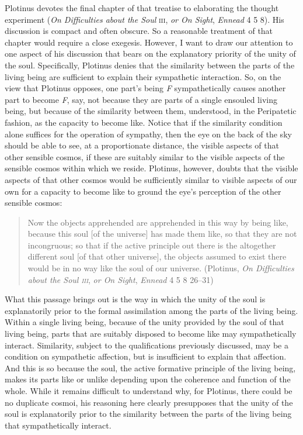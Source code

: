 Plotinus devotes the final chapter of that treatise to elaborating the thought experiment (\emph{On Difficulties about the Soul} \textsc{iii}, \emph{or On Sight}, \emph{Ennead} 4 5 8). His discussion is compact and often obscure. So a reasonable treatment of that chapter would require a close exegesis. However, I want to draw our attention to one aspect of his discussion that bears on the explanatory priority of the unity of the soul. Specifically, Plotinus denies that the similarity between the parts of the living being are sufficient to explain their sympathetic interaction. So, on the view that Plotinus opposes, one part's being \emph{F} sympathetically causes another part to become \emph{F}, say, not because they are parts of a single ensouled living being, but because of the similarity between them, understood, in the Peripatetic fashion, as the capacity to become like. Notice that if the similarity condition alone suffices for the operation of sympathy, then the eye on the back of the sky should be able to see, at a proportionate distance, the visible aspects of that other sensible cosmos, if these are suitably similar to the visible aspects of the sensible cosmos within which we reside. Plotinus, however, doubts that the visible aspects of that other cosmos would be sufficiently similar to visible aspects of our own for a capacity to become like to ground the eye's perception of the other sensible cosmos:
\begin{quote}
	Now the objects apprehended are apprehended in this way by being like, because this soul [of the universe] has made them like, so that they are not incongruous; so that if the active principle out there is the altogether different soul [of that other universe], the objects assumed to exist there would be in no way like the soul of our universe. (Plotinus, \emph{On Difficulties about the Soul \textsc{iii}}, \emph{or On Sight}, \emph{Ennead} 4 5 8 26--31)
\end{quote}
What this passage brings out is the way in which the unity of the soul is explanatorily prior to the formal assimilation among the parts of the living being. Within a single living being, because of the unity provided by the soul of that living being, parts that are suitably disposed to become like may sympathetically interact. Similarity, subject to the qualifications previously discussed, may be a condition on sympathetic affection, but is insufficient to explain that affection. And this is so because the soul, the active formative principle of the living being, makes its parts like or unlike depending upon the coherence and function of the whole. While it remains difficult to understand why, for Plotinus, there could be no duplicate cosmoi, his reasoning here clearly presupposes that the unity of the soul is explanatorily prior to the similarity between the parts of the living being that sympathetically interact.

